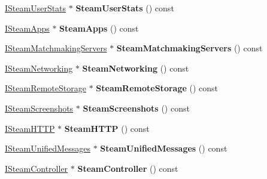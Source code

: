 \begin{DoxyCompactItemize}
\hyperlink{class_i_steam_user_stats}{I\+Steam\+User\+Stats} $\ast$ {\bfseries Steam\+User\+Stats} () const
\item 
\mbox{\label{class_c_steam_a_p_i_context_aa4f9956d1b55a878c0d47ad4c94c66cf}} 
\hyperlink{class_i_steam_apps}{I\+Steam\+Apps} $\ast$ {\bfseries Steam\+Apps} () const
\item 
\mbox{\label{class_c_steam_a_p_i_context_a74a583bb0e7ea771878276a10b1cc57e}} 
\hyperlink{class_i_steam_matchmaking_servers}{I\+Steam\+Matchmaking\+Servers} $\ast$ {\bfseries Steam\+Matchmaking\+Servers} () const
\item 
\mbox{\label{class_c_steam_a_p_i_context_a0223a88d248956a3962ed3fbdaf38f96}} 
\hyperlink{class_i_steam_networking}{I\+Steam\+Networking} $\ast$ {\bfseries Steam\+Networking} () const
\item 
\mbox{\label{class_c_steam_a_p_i_context_abd89ce40a0f8a6a87df6947e5c78f6bd}} 
\hyperlink{class_i_steam_remote_storage}{I\+Steam\+Remote\+Storage} $\ast$ {\bfseries Steam\+Remote\+Storage} () const
\item 
\mbox{\label{class_c_steam_a_p_i_context_afed805ff37b198728f7c6fd57fe8119a}} 
\hyperlink{class_i_steam_screenshots}{I\+Steam\+Screenshots} $\ast$ {\bfseries Steam\+Screenshots} () const
\item 
\mbox{\label{class_c_steam_a_p_i_context_a8cdb18b7f14de407033b1cf92d665f34}} 
\hyperlink{class_i_steam_h_t_t_p}{I\+Steam\+H\+T\+TP} $\ast$ {\bfseries Steam\+H\+T\+TP} () const
\item 
\mbox{\label{class_c_steam_a_p_i_context_ab27f0f722f3f7478bcadbcd15aabb4b8}} 
\hyperlink{class_i_steam_unified_messages}{I\+Steam\+Unified\+Messages} $\ast$ {\bfseries Steam\+Unified\+Messages} () const
\item 
\mbox{\label{class_c_steam_a_p_i_context_ac97519bd9cff0390194eebb8015a477d}} 
\hyperlink{class_i_steam_controller}{I\+Steam\+Controller} $\ast$ {\bfseries Steam\+Controller} () const
\item 

\end{DoxyCompactItemize}
